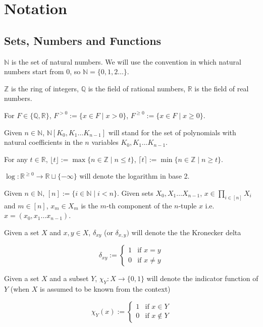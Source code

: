 \documentclass{article}
\numberwithin{equation}{section}
\theoremstyle{definition}
\theoremstyle{plain}
\newcommand{\Bool}{\{0,1\}}
\newcommand{\Nats}{\mathbb{N}}
\newcommand{\Ints}{\mathbb{Z}}
\newcommand{\Rats}{\mathbb{Q}}
\newcommand{\Reals}{\mathbb{R}}
\newcommand{\NatPoly}{\Nats[K_0, K_1 \ldots K_{n-1}]}
\newcommand{\Floor}[1]{\lfloor #1 \rfloor}
\newcommand{\Ceil}[1]{\lceil #1 \rceil}
\begin{document}
\setcounter{section}{-1}

\section{Notation}
%
\subsection{Sets, Numbers and Functions}

$\Nats$ is the set of natural numbers. We will use the convention in which natural numbers start from 0, so $\Nats = \{0, 1, 2 \ldots \}$. 

$\Ints$ is the ring of integers, $\Rats$ is the field of rational numbers, $\Reals$ is the field of real numbers.

For $F \in \{\Rats,\Reals\}$, $F^{>0} := \{x \in F \mid x > 0\}$, $F^{\geq 0} := \{x \in F \mid x \geq 0\}$.

Given ${n \in \Nats}$, ${\NatPoly}$ will stand for the set of polynomials with natural coefficients in the ${n}$ variables ${K_0, K_1 \ldots K_{n-1}}$.

For any $t \in \Reals$, $\Floor{t} := \max \{n \in \Ints \mid n \leq t\}$, $\Ceil{t} := \min \{n \in \Ints \mid n \geq t\}$.

$\log: \Reals^{\geq 0} \rightarrow \Reals \sqcup \{-\infty\}$ will denote the logarithm in base 2.

Given $n \in \Nats$, $[n]:=\{i \in \Nats \mid i < n\}$. Given sets $X_0, X_1 \ldots X_{n-1}$, ${x \in \prod_{i \in [n]} X_i}$ and $m \in [n]$, $x_m \in X_m$ is the $m$-th component of the $n$-tuple $x$ i.e. ${x=(x_0, x_1 \ldots x_{n-1})}$.

Given a set $X$ and $x,y \in X$, $\delta_{xy}$ (or $\delta_{x,y})$ will denote the the Kronecker delta

$$\delta_{xy} := \begin{cases}1 & \text{if } x=y \\ 0 & \text{if } x \ne y \end{cases}$$

Given a set $X$ and a subset $Y$, $\chi_Y: X \rightarrow \Bool$ will denote the indicator function of $Y$ (when $X$ is assumed to be known from the context)

$$\chi_Y(x):=\begin{cases}1 & \text{if } x \in Y \\ 0 & \text{if } x \not\in Y \end{cases}$$
\end{document}
